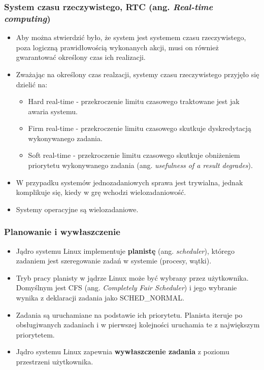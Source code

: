 \documentclass{beamer}
\begin{document}
\begin{frame}
\frametitle{System czasu rzeczywistego, RTC (ang. \textit{Real-time computing})}
\begin{itemize}
    \item Aby można stwierdzić było, że system jest systemem czasu rzeczywistego, poza logiczną prawidłowością 
    wykonanych akcji, musi on również gwarantować określony czas ich realizacji.
    \item Zważając na określony czas realzacji, systemy czasu rzeczywistego przyjęło się dzielić na:
    \begin{itemize}
        \item Hard real-time - przekroczenie limitu czasowego traktowane jest jak awaria systemu.
        \item Firm real-time - przekroczenie limitu czasowego skutkuje dyskredytacją wykonywanego zadania.
        \item Soft real-time - przekroczenie limitu czasowego skutkuje obniżeniem priorytetu wykonywanego zadania (ang. \textit{usefulness of a result degrades}).
    \end{itemize}
    \item W przypadku systemów jednozadaniowych sprawa jest trywialna, jednak komplikuje się, 
    kiedy w grę wchodzi wielozadaniowość.
    \item Systemy operacyjne są wielozadaniowe.
\end{itemize}
\end{frame}

\begin{frame}
\frametitle{Planowanie i wywłaszczenie}
\begin{itemize}
    \item Jądro systemu Linux implementuje \textbf{planistę} (ang. \textit{scheduler}), którego zadaniem jest
    szeregowanie zadań w systemie (procesy, wątki).
    \item Tryb pracy planisty w jądrze Linux może być wybrany przez użytkownika. Domyślnym jest CFS (ang. \textit{Completely Fair Scheduler})
    i jego wybranie wynika z deklaracji zadania jako SCHED\_NORMAL.
    \item Zadania są uruchamiane na podstawie ich priorytetu. Planista iteruje po obsługiwanych zadaniach i
    w pierwszej kolejności uruchamia te z największym priorytetem.
    \item Jądro systemu Linux zapewnia \textbf{wywłaszczenie zadania} z poziomu przestrzeni użytkownika.
\end{itemize}
\end{frame}
\end{document}
